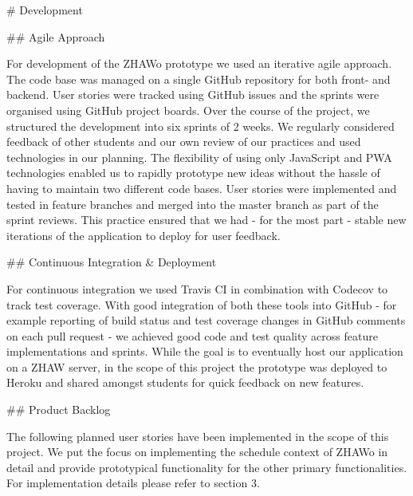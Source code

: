 \begin{markdown}

# Development

## Agile Approach

For development of the ZHAWo prototype we used an iterative agile approach. The code base was managed on a single GitHub repository \cite{OurGithub} for both front- and backend. User stories were tracked using GitHub issues and the sprints were organised using GitHub project boards. Over the course of the project, we structured the development into six sprints of 2 weeks. We regularly considered feedback of other students and our own review of our practices and used technologies in our planning. The flexibility of using only JavaScript and PWA technologies enabled us to rapidly prototype new ideas without the hassle of having to maintain two different code bases.
User stories were implemented and tested in feature branches and merged into the master branch as part of the sprint reviews. This practice ensured that we had - for the most part - stable new iterations of the application to deploy for user feedback.

## Continuous Integration \& Deployment

For continuous integration we used Travis CI \cite{Travis} in combination with Codecov \cite{Codecov} to track test coverage. With good integration of both these tools into GitHub - for example reporting of build status and test coverage changes in GitHub comments on each pull request - we achieved good code and test quality across feature implementations and sprints.
While the goal is to eventually host our application on a ZHAW server, in the scope of this project the prototype was deployed to Heroku \cite{Heroku} and shared amongst students for quick feedback on new features.

\newpage

## Product Backlog

The following planned user stories have been implemented in the scope of this project. We put the focus on implementing the schedule context of ZHAWo in detail and provide prototypical functionality for the other primary functionalities. For implementation details please refer to section 3.


\end{markdown}
